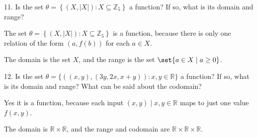 \documentclass{hippoidC}
\begin{document}
\begin{prooflist}{11. Is the set $\theta=\left\{(X,|X|): X \subseteq
			\mathbb{Z}_5\right\}$ a function? If so, what is its domain and range?}
	\item
	The set $\theta=\left\{(X,|X|): X \subseteq \mathbb{Z}_5\right\}$ is a
	function, because there is only one relation of the form $(a, f(b))$ for
	each $a\in X$.
	\item The domain is the set $X$, and the range is the set $\set{a\in X\mid a\geq
			0}$.

\end{prooflist}

\begin{prooflist}{12. Is the set $\theta=\{((x, y),(3 y, 2 x, x+y)): x, y \in
			\mathbb{R}\}$ a function? If so, what is its domain and range? What can be
		said about the codomain?}
	\item Yes it is a function, because each input $(x, y)\mid x, y\in\mathbb{R}$
	maps to just one value $f(x, y)$.
	\item The domain is $\mathbb{R}\times\mathbb{R}$, and the range and codomain are
	$\mathbb{R}\times\mathbb{R}\times\mathbb{R}$.
\end{prooflist}
\end{document}
